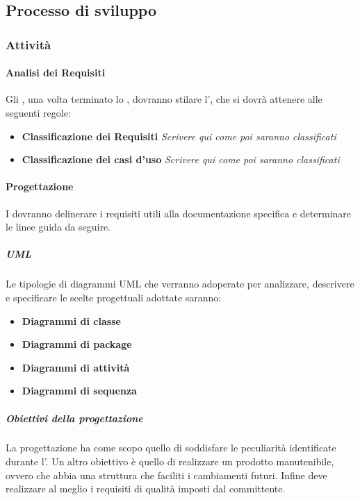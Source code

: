 \subsection{Processo di sviluppo}
\subsubsection{Attività}
\paragraph{Analisi dei Requisiti}
	Gli \anas, una volta terminato lo \SdF, dovranno stilare l'\AdR, che si dovrà attenere alle seguenti regole:
	\begin{itemize}
	\item \textbf{Classificazione dei Requisiti}
	\textit{Scrivere qui come poi saranno classificati}
	\item \textbf{Classificazione dei casi d'uso}
	\textit{Scrivere qui come poi saranno classificati}
	\end{itemize}
\paragraph{Progettazione}
	I \progs dovranno delinerare i requisiti utili alla documentazione specifica e determinare le linee guida da seguire.
	\subparagraph{UML}
	Le tipologie di diagrammi UML che verranno adoperate per analizzare, descrivere e specificare le scelte progettuali adottate saranno:
	\begin{itemize}
		\item \textbf{Diagrammi di classe}
		\item \textbf{Diagrammi di package}
		\item \textbf{Diagrammi di attività}
		\item \textbf{Diagrammi di sequenza}
	\end{itemize}
	
	\subparagraph{Obiettivi della progettazione}
	La progettazione ha come scopo quello di soddisfare le peculiarità identificate durante l'\AdR.
	Un altro obiettivo è quello di realizzare un prodotto manutenibile, ovvero che abbia una struttura che faciliti i cambiamenti futuri.
	Infine deve realizzare al meglio i requisiti di qualità imposti dal committente.
